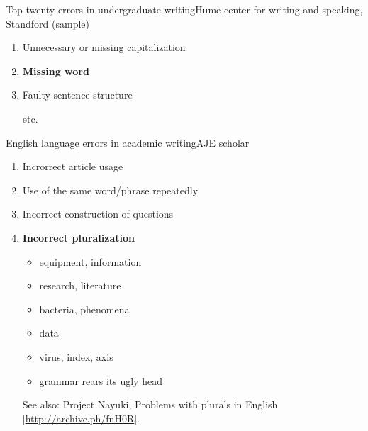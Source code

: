 \documentclass[onepage, 12pt]{beamer}
\begin{document}
\begin{frame}[t]{Top twenty errors in undergraduate writing}{Hume center for writing and speaking, Standford (sample)}
\begin{enumerate}
	\item<8->
		Unnecessary or missing capitalization
		
	
	\item<9->
		\textbf{Missing word}
		
	
	\item<10->
		Faulty sentence structure
		
		{\only<10>{}}
		
		etc.
	\end{enumerate}
	
	\vspace{-10cm}
\end{frame}


\begin{frame}[t]{English language errors in academic writing}{AJE scholar}
	\begin{enumerate}
	\item
		Incrorrect article usage
	
	\item
		Use of the same word/phrase repeatedly
	
	\item
		Incorrect construction of questions
	
	\item
		\textbf{Incorrect pluralization}
		
		\begin{itemize}
		\item 
			equipment, information
		\item
			research, literature
		\end{itemize}
		
		\begin{itemize}
		\item 
			bacteria, phenomena
		\item
			data
		\item
			virus, index, axis
		\end{itemize}

		\begin{itemize}
		\item
			grammar rears its ugly head
		\end{itemize}

		{\scriptsize
			See also: Project Nayuki, Problems with plurals in English
			[\href{http://archive.ph/fnH0R}{http://archive.ph/fnH0R}].
		}
	\end{enumerate}

\end{frame}
\end{document}
